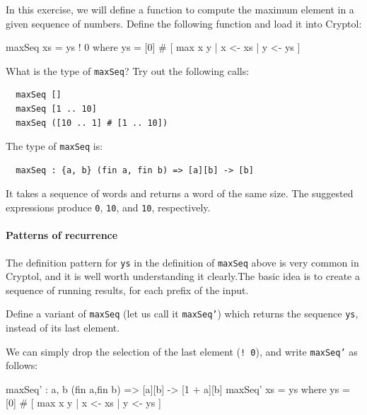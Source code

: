 \begin{Exercise}\label{ex:recfun:2}
  In this exercise, we will define a function to compute the maximum
  element in a given sequence of numbers.  Define the following
  function and load it into Cryptol:\indRIndex\indRecurrence\indMax
\begin{code}
  maxSeq xs = ys ! 0
      where ys = [0] # [ max x y | x <- xs
                                 | y <- ys
                       ]
\end{code}
What is the type of {\tt maxSeq}? Try out the following calls:
\begin{Verbatim}
  maxSeq []
  maxSeq [1 .. 10]
  maxSeq ([10 .. 1] # [1 .. 10])
\end{Verbatim}
\end{Exercise}
\begin{Answer}
The type of {\tt maxSeq} is:
\begin{Verbatim}
  maxSeq : {a, b} (fin a, fin b) => [a][b] -> [b]
\end{Verbatim}
It takes a sequence of words and returns a word of the same size.  The
suggested expressions produce {\tt 0}, {\tt 10}, and {\tt 10},
respectively.
\end{Answer}

\paragraph*{Patterns of recurrence} The definition pattern for {\tt ys}
in the definition of {\tt maxSeq} above is very common in Cryptol, and
it is well worth understanding it clearly.\indRecurrence The basic
idea is to create a sequence of running results, for each prefix of
the input.

\begin{Exercise}\label{ex:recfun:3}
  Define a variant of {\tt maxSeq} (let us call it {\tt maxSeq'})
  which returns the sequence {\tt ys}, instead of its last element.
\end{Exercise}
\begin{Answer}
  We can simply drop the selection of the last element ({\tt ! 0}),
  and write {\tt maxSeq'} as follows:\indRIndex
\begin{code}
  maxSeq' : {a, b} (fin a,fin b) => [a][b] -> [1 + a][b]
  maxSeq' xs = ys
      where ys = [0] # [ max x  y | x <- xs
                                  | y <- ys
                       ]
\end{code}
\end{Answer}

